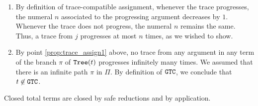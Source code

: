 \documentclass{article}
\newenvironment{proof}[1][Proof]{\begin{trivlist}
\item[\hskip \labelsep {\bfseries #1}]}{\end{trivlist}}
\begin{document}
\begin{proof}
\begin{enumerate}
\item
By definition of trace-compatible assignment, whenever the trace progresses, 
the numeral $n$ associated to the progressing argument decreases by $1$.
Whenever the trace does not progress, the numeral $n$ remains the same.
Thus, a trace from $j$ progresses at most $n$ times, as we wished to show.
\item
By point \ref{prop:trace_assign1} above, 
no trace from any argument in any term of the branch $\pi$ of ${\tt Tree}(t)$ progresses infinitely many times.
We assumed that there is an infinite path $\pi$ in $\Pi$.
By definition of ${\tt GTC}$, we conclude that $t \not \in {\tt GTC}$. 
\end{enumerate}
\end{proof}

Closed total terms are closed by safe reductions and by application. 
\end{document}
